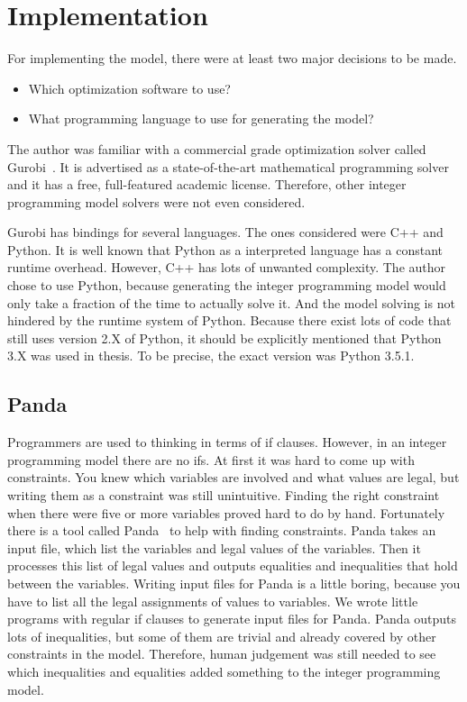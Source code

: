 \section{Implementation}
For implementing the model, there were at least two major decisions to be made.
\begin{itemize}
    \item Which optimization software to use?
    \item What programming language to use for generating the model?
\end{itemize}
The author was familiar with a commercial grade optimization solver called
Gurobi~\cite{gurobi}. It is advertised as a state-of-the-art mathematical
programming solver and it has a free, full-featured academic license.
Therefore, other integer programming model solvers were not even considered.

Gurobi has bindings for several languages. The ones considered were C++ and
Python. It is well known that Python as a interpreted language has a constant
runtime overhead. However, C++ has lots of unwanted complexity. The author
chose to use Python, because generating the integer programming model would
only take a fraction of the time to actually solve it. And the model solving
is not hindered by the runtime system of Python. Because there exist lots of
code that still uses version 2.X of Python, it should be explicitly
mentioned that Python 3.X was used in thesis. To be precise, the exact version
was Python 3.5.1.
\subsection{Panda}
Programmers are used to thinking in terms of if clauses. However, in an integer
programming model there are no ifs. At first it was hard to come up with
constraints. You knew which variables are involved and what values are legal,
but writing them as a constraint was still unintuitive. Finding the right
constraint when there were five or more variables proved hard to do by
hand. Fortunately there is a tool called Panda~\cite{panda} to help with
finding constraints.
Panda takes an input file, which list the variables and legal values of the
variables. Then it processes this list of legal values and outputs equalities and inequalities
that hold between the variables.
Writing input files for Panda is a little boring, because you have to list all
the legal assignments of values to variables. We wrote little programs with
regular if clauses to generate input files for Panda. Panda outputs lots of
inequalities, but some of them are trivial and already covered by other
constraints in the model. Therefore, human judgement was still needed to see
which inequalities and equalities added something to the integer programming
model.

